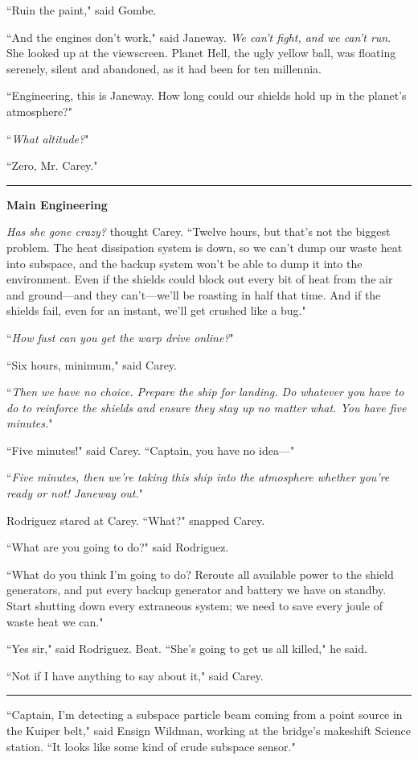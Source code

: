 \documentclass[twoside,letterpaper,12pt]{memoir}
\begin{document}
``Ruin the paint," said Gombe.

``And the engines don't work," said Janeway. \textit{We can't fight, and we can't run}. She looked up at the viewscreen. Planet Hell, the ugly yellow ball, was floating serenely, silent and abandoned, as it had been for ten millennia.

``Engineering, this is Janeway. How long could our shields hold up in the planet's atmosphere?"

``\textit{What altitude?}"

``Zero, Mr. Carey."

\fancybreak{\rule{3cm}{0.4 pt}}
\textbf{Main Engineering}

\textit{Has she gone crazy?} thought Carey. ``Twelve hours, but that's not the biggest problem. The heat dissipation system is down, so we can't dump our waste heat into subspace, and the backup system won't be able to dump it into the environment. Even if the shields could block out every bit of heat from the air and ground---and they can't---we'll be roasting in half that time. And if the shields fail, even for an instant, we'll get crushed like a bug."

``\textit{How fast can you get the warp drive online?}"

``Six hours, minimum," said Carey.

``\textit{Then we have no choice. Prepare the ship for landing. Do whatever you have to do to reinforce the shields and ensure they stay up no matter what. You have five minutes.}"

``Five minutes!" said Carey. ``Captain, you have no idea---"

``\textit{Five minutes, then we're taking this ship into the atmosphere whether you're ready or not! Janeway out.}"

Rodriguez stared at Carey. ``What?" snapped Carey.

``What are you going to do?" said Rodriguez.

``What do you think I'm going to do? Reroute all available power to the shield generators, and put every backup generator and battery we have on standby. Start shutting down every extraneous system; we need to save every joule of waste heat we can."

``Yes sir," said Rodriguez. Beat. ``She's going to get us all killed," he said.

``Not if I have anything to say about it," said Carey.

\fancybreak{\rule{3cm}{0.4 pt}}
``Captain, I'm detecting a subspace particle beam coming from a point source in the Kuiper belt," said Ensign Wildman, working at the bridge's makeshift Science station. ``It looks like some kind of crude subspace sensor."
\end{document}
